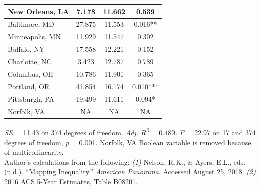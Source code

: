 \documentclass[paper=letter, fontsize=12pt]{scrartcl} %
\begin{document}
\begin{table}
\begin{center}
\begin{tabular}{|| l | c c c ||}
			New Orleans, LA & 7.178 & 11.662 & 0.539\\ 
			\hline 
			Baltimore, MD & 27.875 & 11.553 & 0.016**\\ 
			\hline 
			Minneapolis, MN & 11.929 & 11.547 & 0.302\\ 
			\hline 
			Buffalo, NY & 17.558 & 12.221 & 0.152\\ 
			\hline 
			Charlotte, NC & 3.423 & 12.787 & 0.789\\ 
			\hline 
			Columbus, OH & 10.786 & 11.901 & 0.365\\ 
			\hline 
			Portland, OR & 41.854 & 16.174 & 0.010***\\ 
			\hline 
			Pittsburgh, PA & 19.499 & 11.611 & 0.094*\\ 
			\hline 
			Norfolk, VA & NA & NA & NA\\ 
			\hline
		\end{tabular}
	\end{center}
	\textit{SE} = 11.43 on 374 degrees of freedom. \textit{Adj. R\textsuperscript{2}} = 0.489. \textit{F} = 22.97 on 17 and 374 degrees of freedom, \textit{p} = 0.001. Norfolk, VA Boolean variable is removed because of multicollinearity.\\
	Author's calculations from the following: \textit{(1)} Nelson, R.K., \& Ayers, E.L., eds. (n.d.). ``Mapping Inequality.'' \textit{American Panorama}. Accessed August 25, 2018. \textit{(2)} 2016 ACS 5-Year Estimates, Table B08201.
\end{table}
\end{document}
